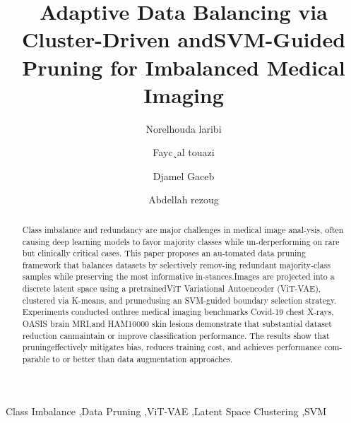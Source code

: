 \documentclass[final,5p,times,twocolumn,authoryear]{elsarticle}
\begin{document}
\begin{frontmatter}
\title{Adaptive Data Balancing via Cluster-Driven andSVM-Guided Pruning for Imbalanced Medical Imaging}
\author[first]{Norelhouda laribi}
\author[second]{Fayc¸al touazi}
\author[third]{Djamel Gaceb}
\author[fourth]{Abdellah rezoug}
\begin{abstract}
Class imbalance and redundancy are major challenges in medical image anal-ysis, often causing deep learning models to favor majority classes while un-derperforming on rare but clinically critical cases. This paper proposes an au-tomated data pruning framework that balances datasets by selectively remov-ing redundant majority-class samples while preserving the most informative in-stances.Images are projected into a discrete latent space using a pretrainedViT Variational Autoencoder (ViT-VAE), clustered via K-means, and prunedusing an SVM-guided boundary selection strategy. Experiments conducted onthree medical imaging benchmarks Covid-19 chest X-rays, OASIS brain MRI,and HAM10000 skin lesions demonstrate that substantial dataset reduction canmaintain or improve classification performance. The results show that pruningeffectively mitigates bias, reduces training cost, and achieves performance com-parable to or better than data augmentation approaches.
\end{abstract}
\begin{keyword}
Class Imbalance \sep Data Pruning \sep ViT-VAE \sep Latent Space Clustering \sep SVM
\end{keyword}
\end{frontmatter}
\end{document}
